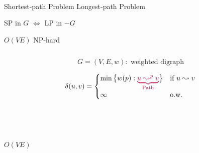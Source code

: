 
\begin{frame}{}
  \begin{center}
     \\[25pt]

    Shortest-path Problem  \quad Longest-path Problem \\[15pt] \pause

    \textsf{SP} in $G$ $\iff$ \textsf{LP} in $-G$ \\[15pt] \pause

    $O(VE)$ {\small {}}  \quad \textsf{NP}-hard {\small {}}
  \end{center}

  \begin{columns}
      \pause
      \pause
  \end{columns}
\end{frame}

\begin{frame}{}
  \begin{definition}
    \[
      G = (V, E, w): \text{ weighted digraph}
    \]

    \[
      \delta(u,v) = \begin{cases}
	\min \big\{ w(p): \textcolor{purple}{\underbrace{u \leadsto^{p} v}_{\text{Path}}} \big\} & \text{if } u \leadsto v \\
	\infty	& \text{o.w.}
      \end{cases}
    \]
  \end{definition}

  \pause
  \vspace{0.60cm}
  \begin{center}
     \\[15pt] \pause

     \\[15pt] \pause

    $O(VE)$
  \end{center}
\end{frame}

